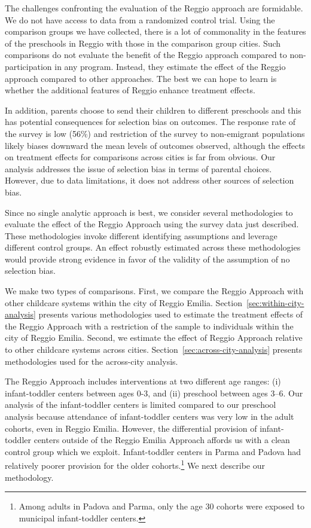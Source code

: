 The challenges confronting the evaluation of the Reggio approach are formidable. We do not have access to data from a randomized control trial. Using the comparison groups we have collected, there is a lot of commonality in the features of the preschools in Reggio with those in the comparison group cities. Such comparisons do not evaluate the benefit of the Reggio approach compared to non-participation in any program. Instead, they estimate the effect of the Reggio approach compared to other approaches. The best we can hope to learn is whether the additional features of Reggio enhance treatment effects.

In addition, parents choose to send their children to different preschools and this has potential consequences for selection bias on outcomes. The response rate of the survey is low (56\%) and restriction of the survey to non-emigrant populations likely biases downward the mean levels of outcomes observed, although the effects on treatment effects for comparisons across cities is far from obvious. Our analysis addresses the issue of selection bias in terms of parental choices. However, due to data limitations, it does not address other sources of selection bias.

Since no single analytic approach is best, we consider several methodologies to evaluate the effect of the Reggio Approach using the survey data just described. These methodologies invoke different identifying assumptions and leverage different control groups. An effect robustly estimated across these methodologies would provide strong evidence in favor of the validity of the assumption of no selection bias.

We make two types of comparisons. First, we compare the Reggio Approach with other childcare systems within the city of Reggio Emilia. Section~\ref{sec:within-city-analysis} presents various methodologies used to estimate the treatment effects of the Reggio Approach with a restriction of the sample to individuals within the city of Reggio Emilia. Second, we estimate the effect of Reggio Approach relative to other childcare systems across cities. Section~\ref{sec:across-city-analysis} presents methodologies used for the across-city analysis.

The Reggio Approach includes interventions at two different age ranges: (i) infant-toddler centers between ages 0-3, and (ii) preschool between ages 3--6. Our analysis of the infant-toddler centers is limited compared to our preschool analysis because attendance of infant-toddler centers was very low in the adult cohorts, even in Reggio Emilia. However, the differential provision of infant-toddler centers outside of the Reggio Emilia Approach affords us with a clean control group which we exploit. Infant-toddler centers in Parma and Padova had relatively poorer provision for the older cohorts.\footnote{Among adults in Padova and Parma, only the age 30 cohorts were exposed to municipal infant-toddler centers.} We next describe our methodology.

